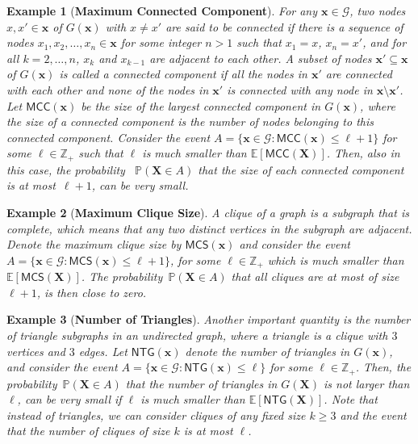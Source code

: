 \documentclass[pdflatex, sn-mathphys-ay]{sn-jnl}%
\newcommand{\intg}{\mathbb{Z}}
\renewcommand{\v}[1]{\boldsymbol{#1}}
\newcommand{\pp}{\mathbb{P}}
\newcommand{\ee}{\mathbb{E}}
\newcommand{\mx}{\v{x}}
\newcommand{\mX}{\v{X}}
\newcommand{\scG}{\mathscr{G}}
\newcommand{\lt}{\left}
\newcommand{\rt}{\right}
\newcommand{\mcc}{\mathsf{MCC}}
\newcommand{\ntg}{\mathsf{NTG}}
\newcommand{\mcs}{\mathsf{MCS}}
\theoremstyle{thmstyleone}%
\theoremstyle{thmstyletwo}%
\newtheorem{example}{Example}%
\theoremstyle{thmstylethree}%
\begin{document}
\begin{example}[\bf Maximum Connected Component]
\normalfont
\label{expl:mcc}
For any $\mx \in \scG$, two nodes $x, x' \in \mx$ of $G(\mx)$ with $x\not= x'$ are said to be  connected if there is a sequence of nodes $x_1, x_2, \dots, x_n \in \mx$ for some integer $n>1$ such that 
$x_1 = x$, $x_n = x'$, and for all $k = 2,\dots, n$, $x_k$ and $x_{k -1}$ are adjacent to each other. 
A subset of nodes $\mx' \subseteq \mx$ of $G(\mx)$ is called a  connected component if all the nodes in $\mx'$ are 
connected with each other and none of the nodes in $\mx'$ is connected with any node in $\mx\setminus \mx'$. 
Let $\mcc(\mx)$ be 
the size of the largest connected component in $G(\mx)$, where the size of a connected component is the number of nodes belonging to this connected component. 
Consider the event 
$A = \{ \mx \in \scG : \mcc\lt( \mx\rt) \leq \ell +1\}$ 
for some $\ell  \in \intg_+$ such that $\ell$ {  is much smaller} than $\ee[\mcc(\mX)]$. 
Then, also in this case,  the  probability ~$\pp\lt(\mX \in A\rt)$ 
that the size of each connected component is at most~$\ell + 1$, can be very small.  
\end{example}

\begin{example}[\bf Maximum Clique Size]
\normalfont
\label{expl:mcs}
A  clique of a graph is a subgraph that is complete, which means that any two distinct vertices in the subgraph 
are adjacent. Denote the 
 maximum clique size by $\mcs(\mx)$ and    consider the event 
$A = \{ \mx \in \scG : \mcs( \mx) \leq \ell + 1\}$,
for some $\ell  \in \intg_+$ which is much smaller than $\ee[\mcs( \mX)]$. 
The probability~$ \pp\lt(\mX \in A\rt)$ 
 that all  cliques are at most of  size~$\ell+1$, is then  close to zero. 
\end{example}

\begin{example}[\bf Number of Triangles]
\normalfont
\label{expl:ntg}
Another important quantity is the number of triangle subgraphs in an undirected graph, where 
a triangle is a clique with $3$ vertices and $3$ edges. 
Let $\ntg(\mx)$ denote the number of triangles in $G(\mx)$, and consider the event
$A = \{ \mx \in \scG : \ntg\lt( \mx\rt) \leq \ell \}$
for some  $\ell  \in \intg_+$. 
Then, the  probability~$ \pp\lt(\mX \in A\rt)$  that {  the number of triangles} in $G(\mX)$ is not larger than $\ell$, can be very small if  $\ell$ is 
much smaller than
$\ee[\ntg(\mX)]$. Note that  
instead of triangles, we can  consider cliques of any fixed size $k\ge 3$ and the event   that the number of cliques of size $k$ is at most $\ell$. 
\end{example}
\end{document}
